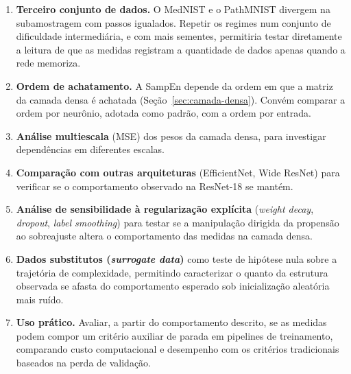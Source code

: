 \begin{enumerate}
  \item \textbf{Terceiro conjunto de dados.} O MedNIST e o PathMNIST divergem
  na subamostragem com passos igualados. Repetir os regimes num conjunto de
  dificuldade intermediária, e com mais sementes, permitiria testar
  diretamente a leitura de que as medidas registram a quantidade de dados
  apenas quando a rede memoriza.

  \item \textbf{Ordem de achatamento.} A SampEn depende da ordem em que
  a matriz da camada densa é achatada (Seção~\ref{sec:camada-densa}). Convém
  comparar a ordem por neurônio, adotada como padrão, com a ordem por entrada.

  \item \textbf{Análise multiescala} (MSE) \cite{costa2002,costa2005}
  dos pesos da camada densa, para investigar dependências em diferentes
  escalas.

  \item \textbf{Comparação com outras arquiteturas} (EfficientNet,
  Wide ResNet) para verificar se o comportamento observado na ResNet-18
  se mantém.

  \item \textbf{Análise de sensibilidade à regularização explícita}
  (\emph{weight decay}, \emph{dropout}, \emph{label smoothing}) para
  testar se a manipulação dirigida da propensão ao sobreajuste altera o
  comportamento das medidas na camada densa.

  \item \textbf{Dados substitutos (\emph{surrogate data})} como teste de
  hipótese nula sobre a trajetória de complexidade, permitindo
  caracterizar o quanto da estrutura observada se afasta do
  comportamento esperado sob inicialização aleatória mais ruído.

  \item \textbf{Uso prático.} Avaliar, a partir do comportamento descrito,
  se as medidas podem compor um critério auxiliar de parada em pipelines de
  treinamento, comparando custo computacional e desempenho com os critérios
  tradicionais baseados na perda de validação.
\end{enumerate}
